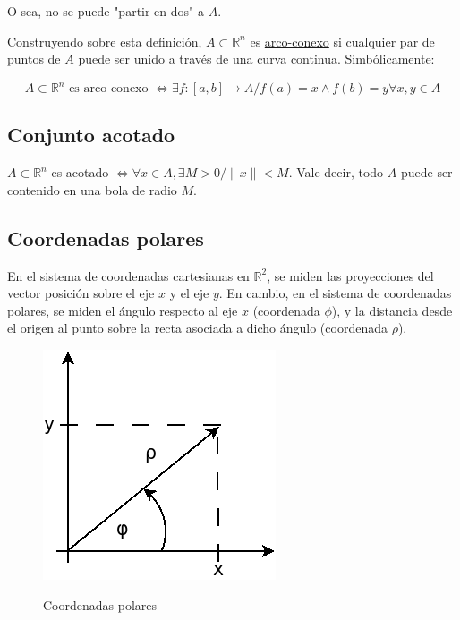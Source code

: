 \documentclass{article}
\renewcommand{\Bbb}{\mathbb}
\begin{document}
O sea, no se puede "partir en dos" a $A$.

Construyendo sobre esta definición, $A \subset \Bbb R^n$ es \underline{arco-conexo} si cualquier par de puntos de $A$ puede ser unido a través de una curva continua. Simbólicamente:

\begin{equation}
A \subset \Bbb R^n \text{ es arco-conexo } \Longleftrightarrow \exists \overline{f}: [a,b] \rightarrow A / \overline{f}(a) = x \wedge \overline{f}(b) = y \forall x,y \in A
\end{equation}

\subsection{Conjunto acotado}

$A \subset \Bbb R^n$ es acotado $\Longleftrightarrow \forall x \in A, \exists M > 0 / \|x\| < M$. Vale decir, todo $A$ puede ser contenido en una bola de radio $M$.

\subsection{Coordenadas polares}

En el sistema de coordenadas cartesianas en $\Bbb R^2$, se miden las proyecciones del vector posición sobre el eje $x$ y el eje $y$. En cambio, en el sistema de coordenadas polares, se miden el ángulo respecto al eje $x$ (coordenada $\phi$), y la distancia desde el origen al punto sobre la recta asociada a dicho ángulo (coordenada $\rho$).

\begin{figure}[t]
\caption{Coordenadas polares}
\includegraphics[scale=1.0]{img/pra_fig002_polares.png} 
\centering
\label{fig:polares}
\end{figure}
\end{document}
